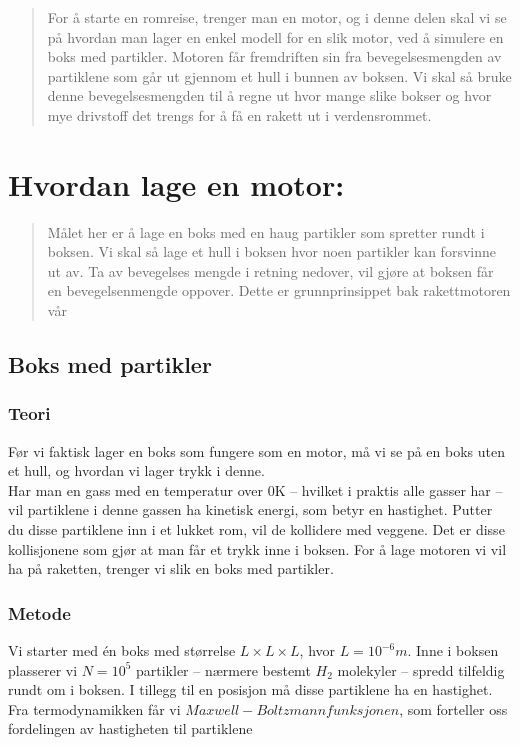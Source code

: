 \documentclass[a4paper,norsk,11pt,twoside]{article}
\begin{document}
\begin{abstract}
For å starte en romreise, trenger man en motor, og i denne delen skal vi se på hvordan man lager en enkel modell for en slik motor, ved å simulere en boks med partikler. Motoren får fremdriften sin fra bevegelsesmengden av partiklene som går ut gjennom et hull i bunnen av boksen. Vi skal så bruke denne bevegelsesmengden til å regne ut hvor mange slike bokser og hvor mye drivstoff det trengs for å få en rakett ut i verdensrommet.
\end{abstract}

\section{Hvordan lage en motor:}

\begin{abstract}
Målet her er å lage en boks med en haug partikler som spretter rundt i boksen. Vi skal så lage et hull i boksen hvor noen partikler kan forsvinne ut av. Ta av bevegelses mengde i retning nedover, vil gjøre at boksen får en bevegelsenmengde oppover. Dette er grunnprinsippet bak rakettmotoren vår
\end{abstract}

\subsection{Boks med partikler}

\subsubsection{Teori}
Før vi faktisk lager en boks som fungere som en motor, må vi se på en boks uten et hull, og hvordan vi lager trykk i denne. \\

Har man en gass med en temperatur over 0K -- hvilket i praktis alle gasser har -- vil partiklene i denne gassen ha kinetisk energi, som betyr en hastighet. Putter du disse partiklene inn i et lukket rom, vil de kollidere med veggene. Det er disse kollisjonene som gjør at man får et trykk inne i boksen. For å lage motoren vi vil ha på raketten, trenger vi slik en boks med partikler.

\subsubsection{Metode}
Vi starter med én boks med størrelse $L \times L \times L$, hvor $L = 10^{-6} m$. Inne i boksen plasserer vi $N = 10^{5}$ partikler -- nærmere bestemt $H_2$ molekyler -- spredd tilfeldig rundt om i boksen. I tillegg til en posisjon må disse partiklene ha en hastighet. Fra termodynamikken får vi $Maxwell-Boltzmann funksjonen$, som forteller oss fordelingen av hastigheten til partiklene
\end{document}
